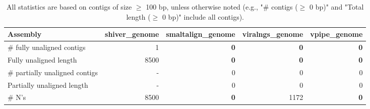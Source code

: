 \documentclass[12pt,a4paper]{article}
\begin{document}
\begin{table}[ht]
\begin{center}
\caption{All statistics are based on contigs of size $\geq$ 100 bp, unless otherwise noted (e.g., "\# contigs ($\geq$ 0 bp)" and "Total length ($\geq$ 0 bp)" include all contigs).}
\begin{tabular}{|l*{4}{|r}|}
\hline
Assembly & shiver\_genome & smaltalign\_genome & viralngs\_genome & vpipe\_genome \\ \hline
\# fully unaligned contigs & 1 & {\bf 0} & {\bf 0} & {\bf 0} \\ \hline
Fully unaligned length & 8500 & {\bf 0} & {\bf 0} & {\bf 0} \\ \hline
\# partially unaligned contigs & - & 0 & 0 & 0 \\ \hline
Partially unaligned length & - & 0 & 0 & 0 \\ \hline
\# N's & 8500 & {\bf 0} & 1172 & {\bf 0} \\ \hline
\end{tabular}
\end{center}
\end{table}
\end{document}
